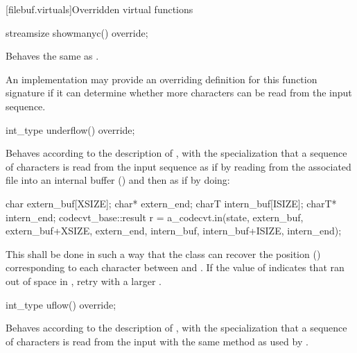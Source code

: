 [filebuf.virtuals]{Overridden virtual functions}

%
\begin{itemdecl}
streamsize showmanyc() override;
\end{itemdecl}

\begin{itemdescr}
\pnum
\effects
Behaves the same as
.
%

\pnum
\remarks
An
implementation may provide an overriding definition for this function
signature if it can determine whether more characters can be read from the input
sequence.
\end{itemdescr}

%
\begin{itemdecl}
int_type underflow() override;
\end{itemdecl}

\begin{itemdescr}
\pnum
\effects
Behaves according to the description of
,
with the specialization that a sequence of characters is read from the input
sequence as if by reading from the associated file
into an internal buffer ()
and then as if by doing:
\begin{codeblock}
char   extern_buf[XSIZE];
char*  extern_end;
charT  intern_buf[ISIZE];
charT* intern_end;
codecvt_base::result r =
  a_codecvt.in(state, extern_buf, extern_buf+XSIZE, extern_end,
               intern_buf, intern_buf+ISIZE, intern_end);
\end{codeblock}

This shall be done in such a way that the class can recover the
position
()
corresponding to each character between
and
.
If the value of
indicates that
ran out of space in
,
retry with a larger
.
\end{itemdescr}

%
\begin{itemdecl}
int_type uflow() override;
\end{itemdecl}

\begin{itemdescr}
\pnum
\effects
Behaves according to the description of
,
with the specialization that a sequence of characters is read from the input
with the same method as used by
.
\end{itemdescr}


